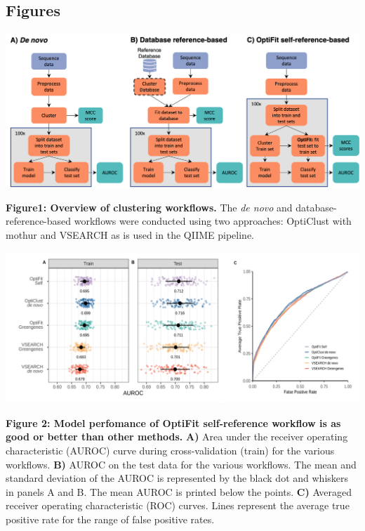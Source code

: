 \documentclass[
]{article}
\begin{document}
\setlength{\parindent}{0in}
\setlength{\leftskip}{0in}

\newpage

\hypertarget{figures}{%
\subsection{Figures}\label{figures}}

\includegraphics{./figures/Figure1.png}

\textbf{Figure1: Overview of clustering workflows.} The \emph{de novo}
and database-reference-based workflows were conducted using two
approaches: OptiClust with mothur and VSEARCH as is used in the QIIME
pipeline.

\newpage

\includegraphics{figures/fig2.png}

\textbf{Figure 2: Model perfomance of OptiFit self-reference workflow is
as good or better than other methods.} \textbf{A)} Area under the
receiver operating characteristic (AUROC) curve during cross-validation
(train) for the various workflows. \textbf{B)} AUROC on the test data
for the various workflows. The mean and standard deviation of the AUROC
is represented by the black dot and whiskers in panels A and B. The mean
AUROC is printed below the points. \textbf{C)} Averaged receiver
operating characteristic (ROC) curves. Lines represent the average true
positive rate for the range of false positive rates.
\end{document}
